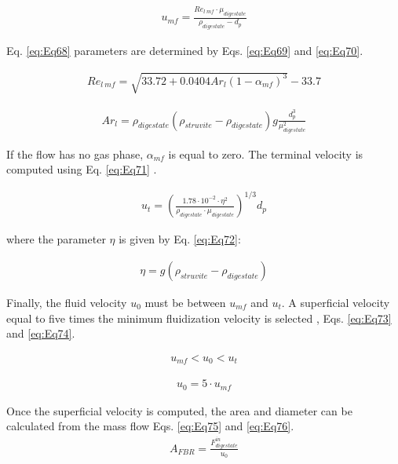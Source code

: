 \begin{refsection}[referencesCh2]
\begin{align}
	{u_{mf}} = \frac{Re_{l \ mf} \cdot {\mu_{digestate}}}{\rho_{digestate} - {d_p}} \label{eq:Eq68}
\end{align}

Eq. \ref{eq:Eq68} parameters are determined by Eqs. \ref{eq:Eq69} and \ref{eq:Eq70}.

\begin{align}
	Re_{l \ mf} = \sqrt {33.72 + 0.0404Ar_{l}{\left( {1 - {\alpha_{mf}}} \right)^3}} - 33.7 \label{eq:Eq69}
\end{align}

\begin{align}
	Ar_{l} = \rho_{digestate} \left( {\rho_{struvite} - {\rho _{digestate}}} \right) g \frac{d_p^3}{\mu_{digestate}^2} \label{eq:Eq70}
\end{align}

If the flow has no gas phase, $\alpha_{mf}$ is equal to zero. The terminal velocity is computed using Eq. \ref{eq:Eq71} \citep{tisa2014basic}.

\begin{align}
	{u_t} = \left( \frac{1.78 \cdot {10}^{ - 2} \cdot {\eta ^2}}{\rho_{digestate} \cdot \mu _{digestate}} \right)^{1/3} {d_p} \label{eq:Eq71}
\end{align}

where the parameter $\eta$ is given by Eq. \ref{eq:Eq72}:

\begin{align}
	\eta  = g\left( {\rho _{struvite} - {\rho _{digestate}}} \right) \label{eq:Eq72}
\end{align}

Finally, the fluid velocity $u_0$ must be between $u_{mf}$ and $u_t$. A superficial velocity equal to five times the minimum fluidization velocity is selected \citep{tejero2004optimization}, Eqs. \ref{eq:Eq73} and \ref{eq:Eq74}.

\begin{align}
	{u_{mf}} < {u_0} < {u_t} \label{eq:Eq73}
\end{align}

\begin{align}
	{u_0} = 5 \cdot {u_{mf}} \label{eq:Eq74}
\end{align}

Once the superficial velocity is computed, the area and diameter can be calculated from the mass flow Eqs. \ref{eq:Eq75} and \ref{eq:Eq76}.
\begin{align}
	{A_{FBR}} = \frac{F_{digestate}^{in}}{u_0} \label{eq:Eq75}
\end{align}


\end{refsection}
